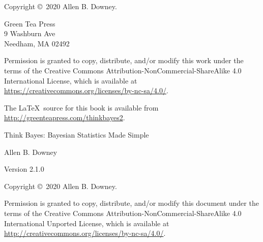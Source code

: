 \documentclass[12pt]{book}
\newcommand{\thetitle}{Think Bayes}
\newcommand{\thesubtitle}{Bayesian Statistics Made Simple}
\newcommand{\theauthor}{Allen B. Downey}
\newcommand{\theversion}{Version 2.1.0}
\theoremstyle{exercise}
\begin{document}
\begin{latexonly}
\newpage
\thispagestyle{empty}

Copyright \copyright ~2020 \theauthor.

\vspace{0.2in}

\begin{flushleft}
Green Tea Press \\
9 Washburn Ave \\
Needham, MA 02492
\end{flushleft}

Permission is granted to copy, distribute, and/or modify this work under the terms of the Creative Commons Attribution-NonCommercial-ShareAlike 4.0 International License, which is available at \url{https://creativecommons.org/licenses/by-nc-sa/4.0/}.


The \LaTeX\ source for this book is available from
\url{http://greenteapress.com/thinkbayes2}.


\cleardoublepage
\setcounter{tocdepth}{1}
\tableofcontents

\end{latexonly}


\begin{htmlonly}

\vspace{1em}

{\Large \thetitle: \thesubtitle}

{\large \theauthor}

\theversion

\vspace{1em}

Copyright \copyright ~2020 \theauthor.

Permission is granted to copy, distribute, and/or modify this document
under the terms of the Creative Commons
Attribution-NonCommercial-ShareAlike 4.0 International
Unported License, which is available at
\url{http://creativecommons.org/licenses/by-nc-sa/4.0/}.

\setcounter{chapter}{-1}

\end{htmlonly}


\fi
\end{document}
